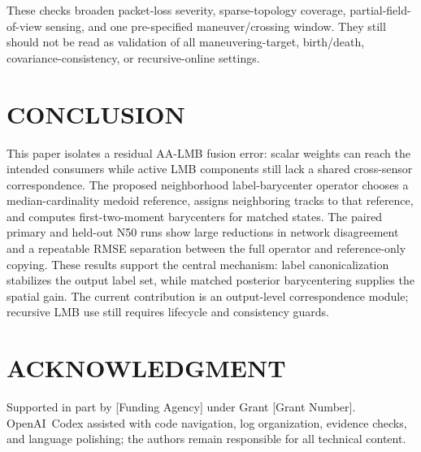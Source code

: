 \documentclass{IEEEtaes}
\newcommand{\method}{neighborhood label-barycenter}
\begin{document}

These checks broaden packet-loss severity, sparse-topology coverage, partial-field-of-view sensing, and one pre-specified maneuver/crossing window. They still should not be read as validation of all maneuvering-target, birth/death, covariance-consistency, or recursive-online settings.

\section{CONCLUSION}
This paper isolates a residual AA-LMB fusion error: scalar weights can reach the intended consumers while active LMB components still lack a shared cross-sensor correspondence. The proposed \method{} operator chooses a median-cardinality medoid reference, assigns neighboring tracks to that reference, and computes first-two-moment barycenters for matched states. The paired primary and held-out N50 runs show large reductions in network disagreement and a repeatable RMSE separation between the full operator and reference-only copying. These results support the central mechanism: label canonicalization stabilizes the output label set, while matched posterior barycentering supplies the spatial gain. The current contribution is an output-level correspondence module; recursive LMB use still requires lifecycle and consistency guards.

\section*{ACKNOWLEDGMENT}
Supported in part by [Funding Agency] under Grant [Grant Number]. \mbox{OpenAI Codex} assisted with code navigation, log organization, evidence checks, and language polishing; the authors remain responsible for all technical content.



\end{document}
